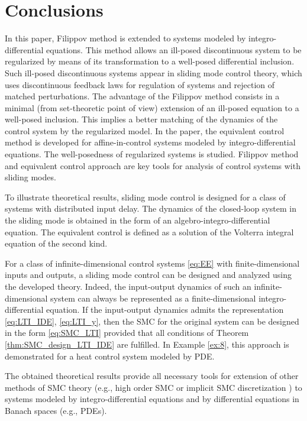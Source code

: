 \documentclass{article}
\begin{document}
\section{Conclusions}\label{sec:con}

In this paper, Filippov method  is extended to systems modeled by integro-differential equations.
This method  allows an ill-posed discontinuous system to be regularized by means of its transformation to a well-posed differential inclusion.  Such ill-posed discontinuous systems appear in sliding mode control theory, which uses discontinuous feedback laws for regulation of systems and rejection of matched perturbations. The advantage of the Filippov method consists in a minimal (from set-theoretic point of view) extension of an ill-posed equation to a well-posed inclusion. This  implies a better matching of the dynamics of the control system by the regularized model.
 In the paper, the equivalent control method is developed for affine-in-control systems modeled by integro-differential equations.  The well-posedness of regularized systems is studied. Filippov method and  equivalent control approach are key tools for analysis of control systems with sliding modes.

To illustrate  theoretical results,  sliding mode control is designed for a class of systems with distributed input delay. The dynamics of the closed-loop system in the sliding mode is obtained in the form of an algebro-integro-differential equation. The equivalent control is defined as a solution of the Volterra  integral equation of the second kind.  

For a class of infinite-dimensional control systems  \eqref{eq:EE} with  finite-dimensional inputs and outputs, a sliding mode control can be designed and analyzed using the developed theory. Indeed, the input-output dynamics of such an infinite-dimensional system can always be represented as a finite-dimensional integro-differential equation. If the input-output dynamics admits the representation \eqref{eq:LTI_IDE}, \eqref{eq:LTI_y}, then  the SMC for the original system can be designed in the form \eqref{eq:SMC_LTI} provided that all conditions of Theorem \ref{thm:SMC_design_LTI_IDE} are fulfilled.
In Example \ref{ex:8}, this approach is demonstrated for a heat control system modeled by PDE. 

The obtained theoretical results  provide all necessary tools for extension  of other
methods of SMC theory  (e.g.,  high order SMC \cite{Levant2003:IJC} or implicit SMC discretization \cite{AcaryBrogliato2010:SCL})
to systems modeled by integro-differential equations  and by differential equations in Banach spaces (e.g.,  PDEs). 


\end{document}
